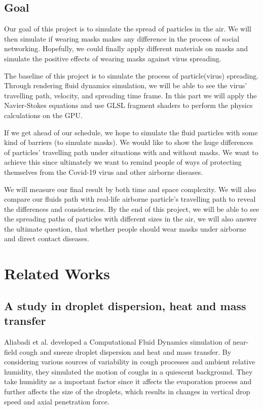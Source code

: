 \documentclass[sigconf]{acmart}
\begin{document}
\subsection{Goal}
Our goal of this project is to simulate the spread of particles in the air. We will then simulate if wearing masks makes any difference in the process of social networking. Hopefully, we could finally apply different materials on masks and simulate the positive effects of wearing masks against virus spreading.

The baseline of this project is to simulate the process of particle(virus) spreading. Through rendering fluid dynamics simulation, we will be able to see the virus' travelling path, velocity, and spreading time frame. In this part we will apply the Navier-Stokes equations and use GLSL fragment shaders to perform the physics calculations on the GPU.

If we get ahead of our schedule, we hope to simulate the fluid particles with some kind of barriers (to simulate masks). We would like to show the huge differences of particles' travelling path under situations with and without masks. We want to achieve this since ultimately we want to remind people of ways of protecting themselves from the Covid-19 virus and other airborne diseases.

We will measure our final result by both time and space complexity. We will also compare our fluids path with real-life airborne particle's travelling path to reveal the differences and consistencies. By the end of this project, we will be able to see the spreading paths of particles with different sizes in the air, we will also answer the ultimate question, that whether people should wear masks under airborne and direct contact diseases.

\section{Related Works}
\subsection{A study in droplet dispersion, heat and mass transfer}
 Aliabadi et al. developed a Computational Fluid Dynamics simulation of near-field cough and sneeze droplet dispersion and heat and mass transfer.\cite{Aliabadi} By considering various sources of variability in cough processes and ambient relative humidity, they simulated the motion of coughs in a quiescent background. They take humidity as a important factor since it affects the evaporation process and further affects the size of the droplets, which results in changes in vertical drop speed and axial penetration force.
\end{document}

